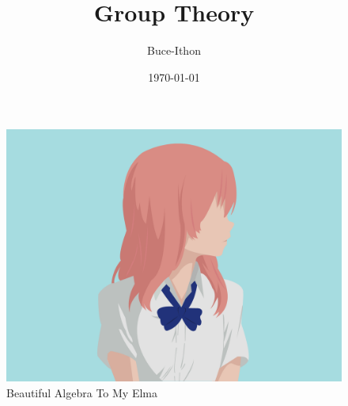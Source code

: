 \documentclass{Math_Note}
\title{Group Theory}
\author{Buce-Ithon}
\date{\today}
\begin{document}
\maketitle

\newpage
\tableofcontents
\newpage

\begin{figure}[H]
    \centering
    \includegraphics[scale=0.24]{"./Figures/Elma.png"}
    \caption{Beautiful Algebra To My Elma}
\end{figure}

\setcounter{section}{-1}
\newpage
\end{document}
